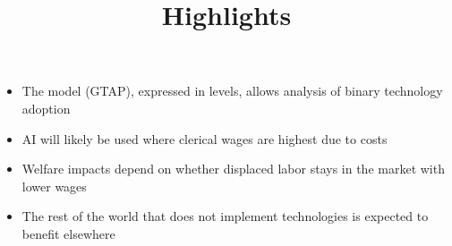 \documentclass{article}
\begin{document}
\title{Highlights}
\begin{itemize}
\item The model (GTAP), expressed in levels, allows analysis of binary technology adoption
\item AI will likely be used where clerical wages are highest due to costs
\item Welfare impacts depend on whether displaced labor stays in the market with lower wages
\item The rest of the world that does not implement technologies is expected to benefit
elsewhere
\end{itemize}
\end{document}

